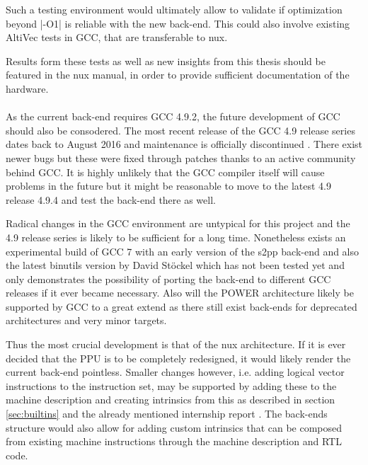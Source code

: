 Such a testing environment would ultimately allow to validate if optimization beyond |-O1| is reliable with the new back-end.
This could also involve existing AltiVec tests in GCC, that are transferable to nux.

Results form these tests as well as new insights from this thesis should be featured in the nux manual, in order to provide sufficient documentation of the hardware.
\\
\\
As the current back-end requires GCC 4.9.2, the future development of GCC should also be consodered.
The most recent release of the GCC 4.9 release series dates back to August 2016 and maintenance is officially discontinued \cite{GCCweb}.
There exist newer bugs but these were fixed through patches thanks to an active community behind GCC.
It is highly unlikely that the GCC compiler itself will cause problems in the future but it might be reasonable to move to the latest 4.9 release 4.9.4 and test the back-end there as well.

Radical changes in the GCC environment are untypical for this project and the 4.9 release series is likely to be sufficient for a long time. 
Nonetheless exists an experimental build of GCC 7 with an early version of the s2pp back-end and also the latest binutils version by David Stöckel which has not been tested yet and only demonstrates the possibility of porting the back-end to different GCC releases if it ever became necessary.
Also will the POWER architecture likely be supported by GCC to a great extend as there still exist back-ends for deprecated architectures and very minor targets.

Thus the most crucial development is that of the nux architecture.
If it is ever decided that the  \ac{PPU} is to be completely redesigned, it would likely render the current back-end pointless.
Smaller changes however, i.e. adding logical vector instructions to the instruction set, may be supported by adding these to the machine description and creating intrinsics from this as described in section \ref{sec:builtins} and the already mentioned internship report \citep{heimbrecht_2017internship}.
The back-ends structure would also allow for adding custom intrinsics that can be composed from existing machine instructions through the machine description and \ac{RTL} code.

